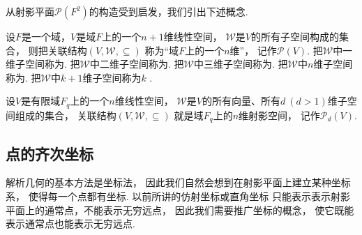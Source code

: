 \begin{example}
\begin{figure}[hbt]
	\caption{}
	\label{figure:射影平面.有限射影平面}
\end{figure}
\end{example}

从射影平面\(\mathcal{P}(F^2)\)的构造受到启发，我们引出下述概念.
\begin{definition}
设\(F\)是一个域，\(V\)是域\(F\)上的一个\(n+1\)维线性空间，
\(\mathscr{W}\)是\(V\)的所有子空间构成的集合，
则把关联结构\((V,\mathscr{W},\subseteq)\)
称为“域\(F\)上的一个\(n\)维”，
记作\(\mathcal{P}(V)\).
把\(\mathscr{W}\)中一维子空间称为.
把\(\mathscr{W}\)中二维子空间称为.
把\(\mathscr{W}\)中三维子空间称为.
把\(\mathscr{W}\)中\(n\)维子空间称为.
把\(\mathscr{W}\)中\(k+1\)维子空间称为\(k\) .
\end{definition}

设\(V\)是有限域\(F_q\)上的一个\(n\)维线性空间，
\(\mathscr{W}\)是\(V\)的所有向量、所有\(d\ (d>1)\)维子空间组成的集合，
关联结构\((V,\mathscr{W},\subseteq)\)
就是域\(F_q\)上的\(n\)维射影空间，
记作\(\mathcal{P}_d(V)\).

\subsection{点的齐次坐标}
解析几何的基本方法是坐标法，
因此我们自然会想到在射影平面上建立某种坐标系，
使得每一个点都有坐标.
以前所讲的仿射坐标或直角坐标
只能表示表示射影平面上的通常点，不能表示无穷远点，
因此我们需要推广坐标的概念，
使它既能表示通常点也能表示无穷远点.

